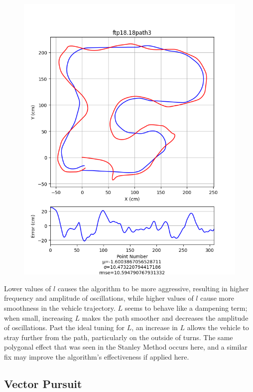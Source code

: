 \documentclass[mla7]{mla}
\begin{document}
\begin{paper}
\begin{figure}[H]
\endminipage\\
\includegraphics[width=\linewidth]{pathData/ftppath3}
\endminipage
\end{figure}

Lower values of $l$ causes the algorithm to be more aggressive, resulting in higher frequency and amplitude of oscillations, while higher values of $l$ cause more smoothness in the vehicle trajectory. $L$ seems to behave like a dampening term; when small, increasing $L$ makes the path smoother and decreases the amplitude of oscillations. Past the ideal tuning for $L$, an increase in $L$ allows the vehicle to stray further from the path, particularly on the outside of turns. The same polygonal effect that was seen in the Stanley Method occurs here, and a similar fix may improve the algorithm's effectiveness if applied here.

\subsection{Vector Pursuit}


\end{paper}
\end{document}

